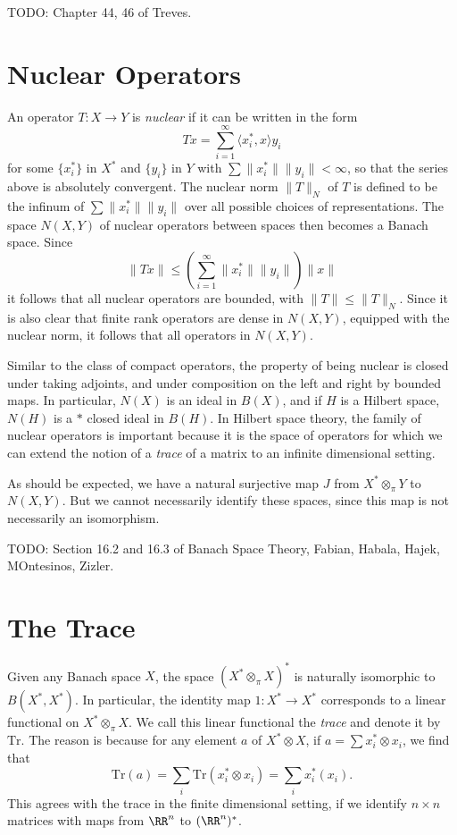  TODO: Chapter 44, 46 of Treves.

\section{Nuclear Operators}

An operator $T: X \to Y$ is \emph{nuclear} if it can be written in the form
%
\[ Tx = \sum_{i = 1}^\infty \langle x_i^*, x \rangle y_i \]
%
for some $\{ x_i^* \}$ in $X^*$ and $\{ y_i \}$ in $Y$ with $\sum \| x_i^* \| \| y_i \| < \infty$, so that the series above is absolutely convergent. The nuclear norm $\| T \|_N$ of $T$ is defined to be the infinum of $\sum \| x_i^* \| \| y_i \|$ over all possible choices of representations. The space $N(X,Y)$ of nuclear operators between spaces then becomes a Banach space. Since
%
\[ \| Tx \| \leq \left( \sum_{i = 1}^\infty \| x_i^* \| \| y_i \| \right) \| x \| \]
%
it follows that all nuclear operators are bounded, with $\| T \| \leq \| T \|_N$. Since it is also clear that finite rank operators are dense in $N(X,Y)$, equipped with the nuclear norm, it follows that all operators in $N(X,Y)$.

Similar to the class of compact operators, the property of being nuclear is closed under taking adjoints, and under composition on the left and right by bounded maps. In particular, $N(X)$ is an ideal in $B(X)$, and if $H$ is a Hilbert space, $N(H)$ is a $*$ closed ideal in $B(H)$. In Hilbert space theory, the family of nuclear operators is important because it is the space of operators for which we can extend the notion of a \emph{trace} of a matrix to an infinite dimensional setting.

As should be expected, we have a natural surjective map $J$ from $X^* \otimes_\pi Y$ to $N(X,Y)$. But we cannot necessarily identify these spaces, since this map is not necessarily an isomorphism.

TODO: Section 16.2 and 16.3 of Banach Space Theory, Fabian, Habala, Hajek, MOntesinos, Zizler.

\section{The Trace}

Given any Banach space $X$, the space $(X^* \otimes_\pi X)^*$ is naturally isomorphic to $B(X^*,X^*)$. In particular, the identity map $1: X^* \to X^*$ corresponds to a linear functional on $X^* \otimes_\pi X$. We call this linear functional the \emph{trace} and denote it by $\text{Tr}$. The reason is because for any element $a$ of $X^* \otimes X$, if $a = \sum x_i^* \otimes x_i$, we find that
%
\[ \text{Tr}(a) = \sum_i \text{Tr}(x_i^* \otimes x_i) = \sum_i x_i^*(x_i). \]
%
This agrees with the trace in the finite dimensional setting, if we identify $n \times n$ matrices with maps from $\RR^n$ to $(\RR^n)^*$.


